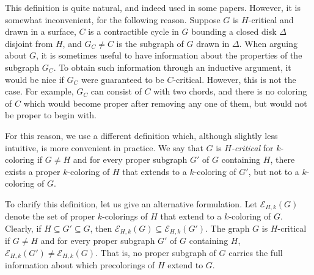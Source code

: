 \documentclass[12pt,twoside,openright,a4paper]{book}
\newcommand{\EE}{\mathcal{E}}
\begin{document}
This definition is quite natural, and indeed used in some papers.  However, it is somewhat inconvenient,
for the following reason.  Suppose $G$ is $H$-critical and drawn in a surface, $C$ is a contractible cycle
in $G$ bounding a closed disk $\Delta$ disjoint from $H$, and $G_C\neq C$ is the subgraph of $G$ drawn in $\Delta$.
When arguing about $G$, it is sometimes useful to have information about the properties of the subgraph $G_C$.
To obtain such information through an inductive argument, it would be nice if $G_C$ were guaranteed to be $C$-critical.
However, this is not the case.  For example, $G_C$ can consist of $C$ with two chords, and there is no coloring of $C$
which would become proper after removing any one of them, but would not be proper to begin with.

For this reason, we use a different definition which, although slightly less intuitive, is more convenient in practice.
We say that $G$ is \emph{$H$-critical} for $k$-coloring if $G\neq H$ and for every proper subgraph $G'$ of $G$ containing $H$,
there exists a proper $k$-coloring of $H$ that extends to a $k$-coloring of $G'$, but not to a $k$-coloring of $G$.

To clarify this definition, let us give an alternative formulation.  Let $\EE_{H,k}(G)$ denote the set of proper $k$-colorings of
$H$ that extend to a $k$-coloring of $G$.  Clearly, if $H\subseteq G'\subseteq G$, then $\EE_{H,k}(G)\subseteq \EE_{H,k}(G')$.
The graph $G$ is $H$-critical if $G\neq H$ and for every proper subgraph $G'$ of $G$ containing $H$, $\EE_{H,k}(G')\neq\EE_{H,k}(G)$.
That is, no proper subgraph of $G$ carries the full information about which precolorings of $H$ extend to $G$.
\end{document}
